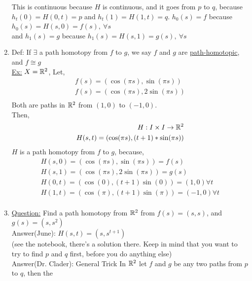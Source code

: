 \begin{enumerate}
\begin{minipage}[c]{\linewidth}
\begin{center}
                \end{center}
            \end{minipage}
            This is continuous because $H$ is continuous, and it goes from $p$ to $q$, because $h_t(0)=H(0,t)=p$ and $h_t(1)=H(1,t)=q$.
            $h_0(s)=f$ because $h_0(s)=H(s,0)=f(s),\ \forall s$\\
            and $h_1(s)=g$ because $h_1(s)=H(s,1)=g(s),\ \forall s$\\
        \item Def: If $\exists$ a path homotopy from $f$ to $g$, we say $f$ and $g$ are \underline{path-homotopic}, and $f\cong g$\\
            \underline{Ex:} $X=\mathbb{R}^2$, Let,
            \begin{align*}
                f(s)=(\cos(\pi s), \sin(\pi s))\\
                f(s)=(\cos(\pi s), 2\sin(\pi s))\\
            \end{align*}
            Both are paths in $\mathbb{R}^2$ from $(1,0)$ to $(-1,0)$.\\
            Then,
            \begin{align*}
                H: I\times I \rightarrow \mathbb{R}^2\\
                H(s,t)=(\cos(\pi s), (t+1)*\sin(\pi s))\\
            \end{align*}
            $H$ is a path homotopy from $f$ to $g$, because,
            \begin{align*}
                H(s,0)=(\cos(\pi s), \sin(\pi s))=f(s)\\
                H(s,1)=(\cos(\pi s), 2\sin(\pi s))=g(s)\\
                H(0,t)=(\cos(0), (t+1)\sin(0))=(1,0)\forall t\\
                H(1,t)=(\cos(\pi), (t+1)\sin(\pi))=(-1,0)\forall t\\
            \end{align*}
        \item \underline{Question:} Find a path homotopy from $\mathbb{R}^2$ from $f(s)=(s,s)$, and $g(s)=(s,s^2)$\\
            Answer(June): $H(s,t)=(s,s^{t+1})$\\
            (see the notebook, there's a solution there. Keep in mind that you want to try to find $p$ and $q$ first, before you do anything else)\\
            Answer(Dr. Clader): General Trick In $\mathbb{R}^2$ let $f$ and $g$ be any two paths from $p$ to $q$, then the

\end{enumerate}

